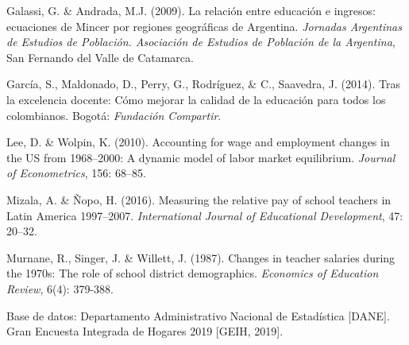 \documentclass[a4paper]{article}
\begin{document}
    \item Galassi, G. \& Andrada, M.J. (2009). La relación entre educación e ingresos: ecuaciones de Mincer por regiones geográficas de Argentina. \textit{Jornadas Argentinas de Estudios de Población. Asociación de Estudios de Población de la Argentina}, San Fernando del Valle de Catamarca.
    
    \item García, S., Maldonado, D., Perry, G., Rodríguez, \& C., Saavedra, J. (2014). Tras la excelencia docente: Cómo mejorar la calidad de la educación para todos los colombianos. Bogotá: \textit{Fundación Compartir}.
    
    \item Lee, D. \& Wolpin, K. (2010). Accounting for wage and employment changes in the US from 1968–2000: A dynamic model of labor market equilibrium. \textit{Journal of Econometrics}, 156: 68–85.
    
    \item Mizala, A. \& Ñopo, H. (2016). Measuring the relative pay of school teachers in Latin America 1997–2007. \textit{International Journal of Educational Development}, 47: 20–32.
    
    \item Murnane, R., Singer, J. \& Willett, J. (1987). Changes in teacher salaries during the 1970s: The role of school district demographics. \textit{Economics of Education Review}, 6(4): 379-388.
    
    \item Base de datos: Departamento Administrativo Nacional de Estadística [DANE]. Gran Encuesta Integrada de Hogares 2019 [GEIH, 2019].
    

\newpage
\appendix
\end{document}

